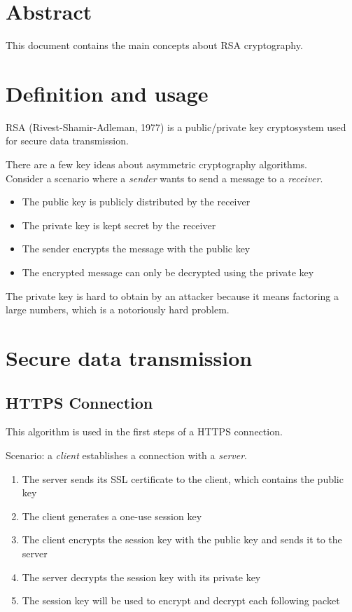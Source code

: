 \documentclass[a4paper]{article}
\author{Paolo Bettelini}
\date{}
\begin{document}
\maketitle

\section*{Abstract}
This document contains the main concepts about RSA cryptography.

\pagebreak

\tableofcontents
\pagebreak

\section{Definition and usage}


RSA (Rivest-Shamir-Adleman, 1977) is a public/private key cryptosystem used for secure data transmission.

There are a few key ideas about asymmetric cryptography algorithms.
\\
Consider a scenario where a \textit{sender} wants to send a message to a \textit{receiver}.
\begin{itemize}
	\item The public key is publicly distributed by the receiver
	\item The private key is kept secret by the receiver
	\item The sender encrypts the message with the public key
	\item The encrypted message can only be decrypted using the private key
\end{itemize}

The private key is hard to obtain by an attacker because it means factoring a large numbers, which is a notoriously hard problem.

\section{Secure data transmission}

\subsection{HTTPS Connection}

This algorithm is used in the first steps of a HTTPS connection.

Scenario: a \textit{client} establishes a connection with a \textit{server}.
\begin{enumerate}
	\item The server sends its SSL certificate to the client, which contains the public key
	\item The client generates a one-use session key
	\item The client encrypts the session key with the public key and sends it to the server
	\item The server decrypts the session key with its private key
	\item The session key will be used to encrypt and decrypt each following packet
\end{enumerate}
\end{document}

